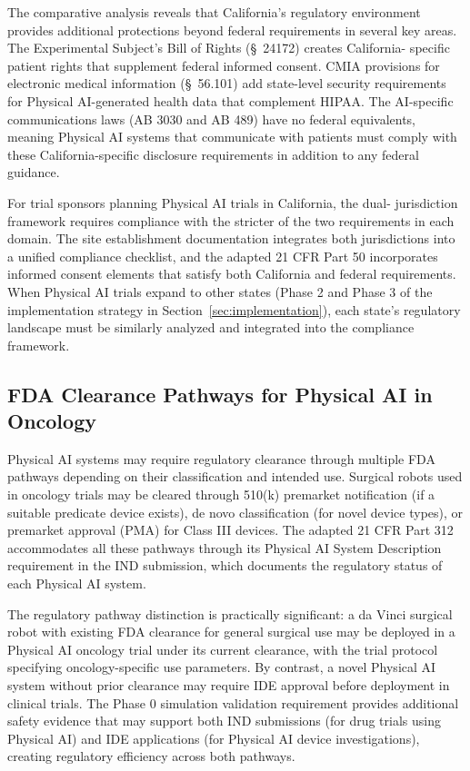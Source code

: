 The comparative analysis reveals that California's regulatory environment
provides additional protections beyond federal requirements in several key
areas. The Experimental Subject's Bill of Rights (\S~24172) creates California-
specific patient rights that supplement federal informed consent. CMIA
provisions for electronic medical information (\S~56.101) add state-level
security requirements for Physical AI-generated health data that complement
HIPAA. The AI-specific communications laws (AB 3030 and AB 489) have no
federal equivalents, meaning Physical AI systems that communicate with patients
must comply with these California-specific disclosure requirements in addition
to any federal guidance.

For trial sponsors planning Physical AI trials in California, the dual-
jurisdiction framework requires compliance with the stricter of the two
requirements in each domain. The site establishment documentation \cite{site-docs}
integrates both jurisdictions into a unified compliance checklist, and the
adapted 21 CFR Part 50 \cite{cfr50-adapt} incorporates informed consent
elements that satisfy both California and federal requirements. When Physical
AI trials expand to other states (Phase 2 and Phase 3 of the implementation
strategy in Section~\ref{sec:implementation}), each state's regulatory
landscape must be similarly analyzed and integrated into the compliance
framework.

\subsection{FDA Clearance Pathways for Physical AI in Oncology}
\label{subsec:fda-clearance-pathways}

Physical AI systems may require regulatory clearance through multiple FDA
pathways depending on their classification and intended use. Surgical robots
used in oncology trials may be cleared through 510(k) premarket notification
(if a suitable predicate device exists), de novo classification (for novel
device types), or premarket approval (PMA) for Class III devices. The adapted
21 CFR Part 312 \cite{cfr312-adapt} accommodates all these pathways through its
Physical AI System Description requirement in the IND submission, which
documents the regulatory status of each Physical AI system.

The regulatory pathway distinction is practically significant: a da Vinci
surgical robot with existing FDA clearance for general surgical use may be
deployed in a Physical AI oncology trial under its current clearance, with the
trial protocol specifying oncology-specific use parameters. By contrast, a
novel Physical AI system without prior clearance may require IDE approval before
deployment in clinical trials. The Phase 0 simulation validation requirement
provides additional safety evidence that may support both IND submissions (for
drug trials using Physical AI) and IDE applications (for Physical AI device
investigations), creating regulatory efficiency across both pathways.

